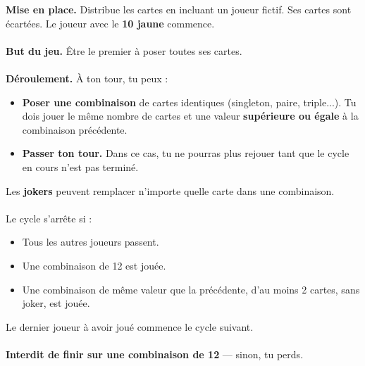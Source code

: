 \documentclass[a4paper]{memoir}
\begin{document}
{\footnotesize


\noindent
\textbf{ Mise en place.}  
Distribue les cartes en incluant un joueur fictif. Ses cartes sont écartées. Le joueur avec le \textbf{10 jaune} commence.
\\
\\
\noindent
\textbf{ But du jeu.}  
Être le premier à poser toutes ses cartes.
\\
\\
\noindent
\textbf{ Déroulement.}  
À ton tour, tu peux :
\begin{itemize}
    \item \textbf{Poser une combinaison} de cartes identiques (singleton, paire, triple...).  
    Tu dois jouer le même nombre de cartes et une valeur \textbf{supérieure ou égale} à la combinaison précédente.
    
    \item \textbf{Passer ton tour.}  
    Dans ce cas, tu ne pourras plus rejouer tant que le cycle en cours n’est pas terminé.
\end{itemize}

\noindent
{} Les \textbf{jokers} peuvent remplacer n’importe quelle carte dans une combinaison.
\\
\\
\noindent
{} Le cycle s’arrête si :
\begin{itemize}
    \item Tous les autres joueurs passent.
    \item Une combinaison de 12 est jouée.
    \item Une combinaison de même valeur que la précédente, d’au moins 2 cartes, sans joker, est jouée.
\end{itemize}
Le dernier joueur à avoir joué  commence le cycle suivant.
\\
\\
 \textbf{Interdit de finir sur une combinaison de 12} — sinon, tu perds.

}
\end{document}
